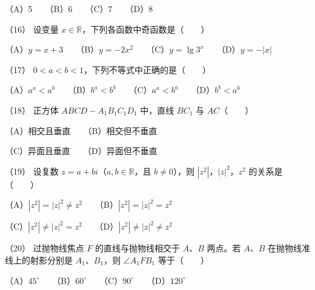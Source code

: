 \begin{question}
（A）5　　（B）6　　（C）7　　（D）8

（16） 设变量 $x\in\mathbb R$，下列各函数中奇函数是\mbox{（　　）}

（A）$y=x+3$　　（B）$y=-2x^2$　　（C）$y=\lg 3^x$　　（D）$y=-|x|$

（17） $0<a<b<1$，下列不等式中正确的是\mbox{（　　）}

（A）$a^a<a^b$　　（B）$b^a<b^b$　　（C）$a^a<b^a$　　（D）$b^b<a^b$

（18） 正方体 $ABCD-A_1B_1C_1D_1$ 中，直线 $BC_1$ 与 $AC$\mbox{（　　）}

（A）相交且垂直　　（B）相交但不垂直

（C）异面且垂直　　（D）异面但不垂直

（19） 设复数 $z=a+bi$（$a,b\in\mathbb R$，且 $b\ne0$），则 $|z^2|$，$|z|^2$，$z^2$ 的关系是\mbox{（　　）}

（A）$|z^2|=|z|^2\ne z^2$　　（B）$|z^2|=|z|^2=z^2$

（C）$|z^2|\ne|z|^2=z^2$　　（D）$|z^2|\ne|z|^2\ne z^2$

（20） 过抛物线焦点 $F$ 的直线与抛物线相交于 $A\text{、}B$ 两点。若 $A\text{、}B$ 在抛物线准线上的射影分别是 $A_1\text{、}B_1$，则 $\angle A_1FB_1$ 等于\mbox{（　　）}

（A）$45^\circ$　　（B）$60^\circ$　　（C）$90^\circ$　　（D）$120^\circ$

\end{question}
